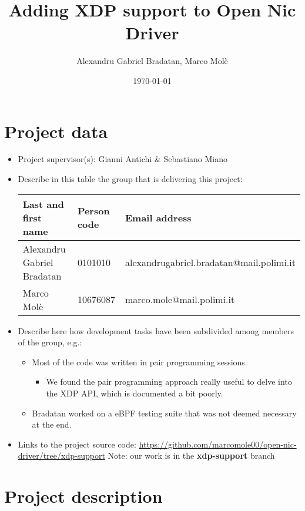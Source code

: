 \documentclass[10pt,a4]{article}
\author{Alexandru Gabriel Bradatan, Marco Molè}
\date{\today}
\title{Adding XDP support to Open Nic Driver}
\begin{document}
\maketitle
\tableofcontents



\section{Project data}

\begin{itemize}
\item  Project supervisor(s): Gianni Antichi \& Sebastiano Miano 

\item 
Describe in this table the group that is delivering this project:

\begin{center}
\begin{tabular}{lll}
Last and first name & Person code & Email address\\
\hline
  Alexandru Gabriel Bradatan & 0101010 & alexandrugabriel.bradatan@mail.polimi.it \\
  Marco Molè & 10676087  &     marco.mole@mail.polimi.it        
\end{tabular}
\end{center}

\item
Describe here how development tasks have been subdivided among members
of the group, e.g.:

\begin{itemize}
\item Most of the code was written in pair programming sessions.
\begin{itemize}
	\item We found the pair programming approach really useful to delve into the XDP API, which is documented a bit poorly. 
\end{itemize}
\item Bradatan worked on a eBPF testing suite that was not deemed necessary at the end.
\end{itemize}

\item Links to the project source code:  \url{https://github.com/marcomole00/open-nic-driver/tree/xdp-support}
Note: our work is in the \textbf{xdp-support} branch

\end{itemize}


\section{Project description}
\end{document}
